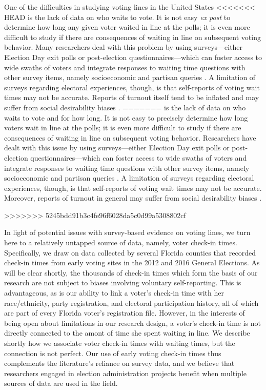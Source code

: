 \documentclass[12pt,titlepage]{article}
\begin{document}
One of the difficulties in studying voting lines in the United States
<<<<<<< HEAD
is the lack of data on who waits to vote.  It is not easy \emph{ex
  post} to determine how long any given voter waited in line at the
polls; it is even more difficult to study if there are consequences of
waiting in line on subsequent voting behavior.  Many researchers deal
with this problem by using surveys---either Election Day exit polls or
post-election questionnaires---which can foster access to wide swaths
of voters and integrate responses to waiting time questions with other
survey items, namely socioeconomic and partisan queries
\citep{stewart:waitingtovote2012}.  A limitation of surveys regarding
electoral experiences, though, is that self-reports of voting wait
times may not be accurate.  Reports of turnout itself tend to be
inflated and may suffer from social desirability biases
\citep{bellietal:overreport,karpbrockington:overreport}.
=======
is the lack of data on who waits to vote and for how long. It is not easy to precisely determine
how long voters wait in line at the polls; it is even more
difficult to study if there are consequences of waiting in line on
subsequent voting behavior.  Researchers have dealt with this issue 
by using surveys---either Election Day exit polls or post-election
questionnaires---which can foster access to wide swaths of voters and
integrate responses to waiting time questions with other survey items,
namely socioeconomic and partisan queries
\citep{stewart:waitingtovote2012}.  A limitation of surveys regarding
electoral experiences, though, is that self-reports of voting wait
times may not be accurate.  Moreover, reports of turnout in general
may suffer from social desirability biases
\citep{karpbrockington:overreport}.

>>>>>>> 5245bdd91b3c4fe96f6028da5c0d99a5308802cf

In light of potential issues with survey-based evidence on voting
lines, we turn here to a relatively untapped source of data, namely,
voter check-in times. Specifically, we draw on data collected by
several Florida counties that recorded check-in times from early
voting sites in the 2012 and 2016 General Elections.  As will be clear
shortly, the thousands of check-in times which form the basis of our
research are not subject to biases involving voluntary self-reporting.
This is advantageous, as is our ability to link a voter's check-in
time with her race/ethnicity, party registration, and electoral
participation history, all of which are part of every Florida voter's
registration file.  However, in the interests of being open about
limitations in our research design, a voter's check-in time is not
directly connected to the amont of time she spent waiting in line.  We
describe shortly how we associate voter check-in times with waiting
times, but the connection is not perfect.  Our use of early voting
check-in times thus complements the literature's reliance on survey
data, and we believe that researchers engaged in election
administration projects benefit when multiple sources of data are used
in the field.
\end{document}
